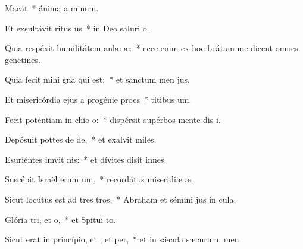 \item Macat~* ánima a minum.
\item Et exsultávit ritus us~* in Deo saluri o.
\item Quia respéxit humilitátem anlæ æ:~* ecce enim ex hoc beátam me dicent omnes genetines.
\item Quia fecit mihi gna qui  est:~* et sanctum men jus.
\item Et misericórdia ejus a progénie  proes~* titibus um.
\item Fecit poténtiam in chio o:~* dispérsit supérbos mente dis i.
\item Depósuit pottes de de,~* et exalvit miles.
\item Esuriéntes imvit nis:~* et dívites disit innes.
\item Suscépit Israël erum um,~* recordátus miseridiæ æ.
\item Sicut locútus est ad tres tros,~* Abraham et sémini jus in cula.
\item Glória tri, et o,~* et Spitui to.
\item Sicut erat in princípio, et , et per,~* et in sǽcula sæcurum. men.
